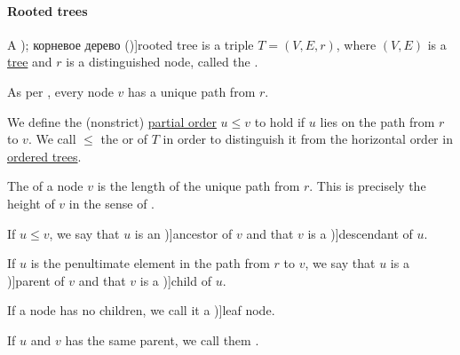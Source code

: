 \paragraph{Rooted trees}

\begin{definition}\label{def:rooted_tree}
  A \term[ru=ориентированное дерево (\cite[323]{ЕмеличевИПр1990Графы}); корневое дерево (\cite[\S 9.2.1]{Новиков2013ДискретнаяМатематика})]{rooted tree} is a triple \( T = (V, E, r) \), where \( (V, E) \) is a \hyperref[def:tree]{tree} and \( r \) is a distinguished node, called the .

  As per , every node \( v \) has a unique path from \( r \).

  \begin{thmenum}
     We define the (nonstrict) \hyperref[def:partially_ordered_set]{partial order} \( u \leq v \) to hold if \( u \) lies on the path from \( r \) to \( v \). We call \( \leq \) the  or  of \( T \) in order to distinguish it from the horizontal order in \hyperref[def:ordered_tree]{ordered trees}.

     The  of a node \( v \) is the length of the unique path from \( r \). This is precisely the height of \( v \) in the sense of .

     If \( u \leq v \), we say that \( u \) is an \term[ru=предок (\cite[298]{БелоусовТкачёв2004ДискретнаяМатематика})]{ancestor} of \( v \) and that \( v \) is a \term[ru=потомок (\cite[298]{БелоусовТкачёв2004ДискретнаяМатематика})]{descendant} of \( u \).

     If \( u \) is the penultimate element in the path from \( r \) to \( v \), we say that \( u \) is a \term[ru=отец (\cite[298]{БелоусовТкачёв2004ДискретнаяМатематика})]{parent} of \( v \) and that \( v \) is a \term[ru=сын (\cite[298]{БелоусовТкачёв2004ДискретнаяМатематика})]{child} of \( u \).

     If a node has no children, we call it a \term[ru=лист (\cite[298]{БелоусовТкачёв2004ДискретнаяМатематика})]{leaf node}.

     If \( u \) and \( v \) has the same parent, we call them .


\end{thmenum}
\end{definition}
